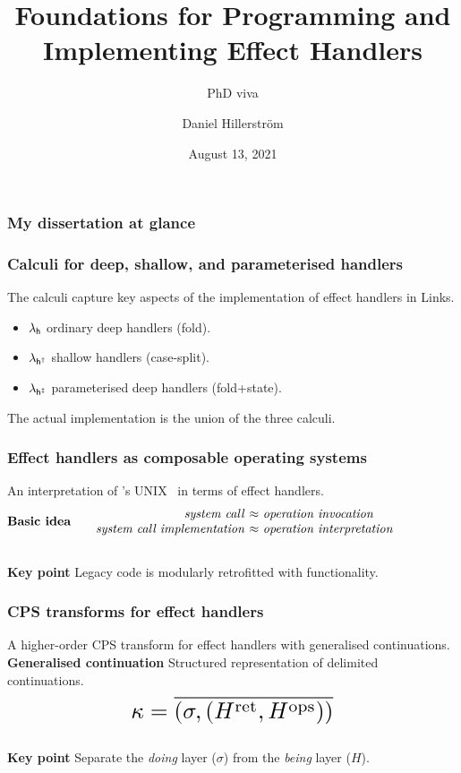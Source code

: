 \documentclass[169,10pt,compress,dvipsnames]{beamer}
\author{Daniel Hillerström}
\title{Foundations for Programming and Implementing Effect Handlers}
\institute{The University of Edinburgh, Scotland UK}
\subtitle{PhD viva}
\date{August 13, 2021}
\newcommand*{\Scale}[2][4]{\scalebox{#1}{\ensuremath{#2}}}%
\begin{document}
%
%
\begin{frame}
  \maketitle
\end{frame}

\begin{frame}
  \frametitle{My dissertation at glance}
\end{frame}

\begin{frame}
  \frametitle{Calculi for deep, shallow, and parameterised handlers}

  The calculi capture key aspects of the implementation of effect
  handlers in Links.

  \begin{itemize}
    \item $\lambda_{\mathsf{h}}$ ordinary deep handlers (fold).
    \item $\lambda_{\mathsf{h^\dagger}}$ shallow handlers (case-split).
    \item $\lambda_{\mathsf{h^{\ddagger}}}$ parameterised deep handlers (fold+state).
  \end{itemize}

  The actual implementation is the union of the three calculi.
\end{frame}

\begin{frame}
  \frametitle{Effect handlers as composable operating systems}

  An interpretation of \citeauthor{RitchieT74}'s
  UNIX~\cite{RitchieT74} in terms of effect handlers.\\[2em]

  \[
    \bl
    \!\!\!\!\!\!\!\!\!\!\!\!\!\!\!\!\!\!\!\!\!\!\!\!\!\!\!\!\textbf{Basic idea}
      \ba[m]{@{\qquad}r@{~}c@{~}l}
        \text{\emph{system call}} &\approx& \text{\emph{operation invocation}}\\
        \text{\emph{system call implementation}} &\approx& \text{\emph{operation interpretation}}
      \ea
    \el
  \]\hfill\\[2em]

  \textbf{Key point} Legacy code is modularly retrofitted with functionality.
\end{frame}

\begin{frame}
  \frametitle{CPS transforms for effect handlers}

  A higher-order CPS transform for effect handlers with generalised
  continuations.\\[1em]

  \textbf{Generalised continuation} Structured representation of
  delimited continuations.\\[0.5em]

  \[
    \Scale[1.8]{\kappa = \overline{(\sigma, (\hret,\hops))}}
  \]\\[1em]

  \textbf{Key point} Separate the \emph{doing} layer ($\sigma$) from the \emph{being} layer ($H$).
\end{frame}
\end{document}
